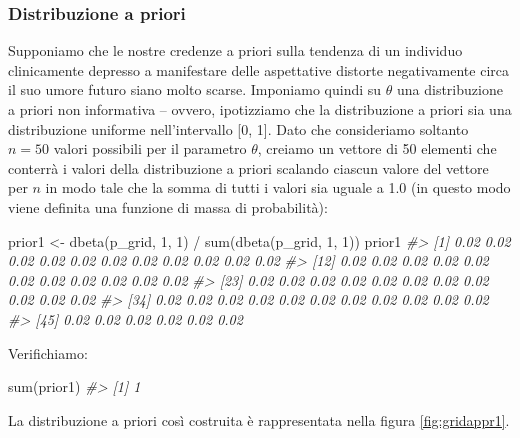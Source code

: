 \documentclass[
]{memoir}
\newenvironment{Shaded}{\begin{snugshade}}{\end{snugshade}}
\newcommand{\CommentTok}[1]{\textcolor[rgb]{0.56,0.35,0.01}{\textit{#1}}}
\newcommand{\DecValTok}[1]{\textcolor[rgb]{0.00,0.00,0.81}{#1}}
\newcommand{\FunctionTok}[1]{\textcolor[rgb]{0.00,0.00,0.00}{#1}}
\newcommand{\NormalTok}[1]{#1}
\newcommand{\OtherTok}[1]{\textcolor[rgb]{0.56,0.35,0.01}{#1}}
\newcommand{\SpecialCharTok}[1]{\textcolor[rgb]{0.00,0.00,0.00}{#1}}
\begin{document}
\hypertarget{distribuzione-a-priori}{%
\subsubsection{Distribuzione a priori}\label{distribuzione-a-priori}}

Supponiamo che le nostre credenze a priori sulla tendenza di un individuo clinicamente depresso a manifestare delle aspettative distorte negativamente circa il suo umore futuro siano molto scarse. Imponiamo quindi su \(\theta\) una distribuzione a priori non informativa -- ovvero, ipotizziamo che la distribuzione a priori sia una distribuzione uniforme nell'intervallo {[}0, 1{]}. Dato che consideriamo soltanto \(n = 50\) valori possibili per il parametro \(\theta\), creiamo un vettore di 50 elementi che conterrà i valori della distribuzione a priori scalando ciascun valore del vettore per \(n\) in modo tale che la somma di tutti i valori sia uguale a 1.0 (in questo modo viene definita una funzione di massa di probabilità):

\begin{Shaded}
\begin{Highlighting}[]
\NormalTok{prior1 }\OtherTok{\textless{}{-}} \FunctionTok{dbeta}\NormalTok{(p\_grid, }\DecValTok{1}\NormalTok{, }\DecValTok{1}\NormalTok{) }\SpecialCharTok{/} \FunctionTok{sum}\NormalTok{(}\FunctionTok{dbeta}\NormalTok{(p\_grid, }\DecValTok{1}\NormalTok{, }\DecValTok{1}\NormalTok{))}
\NormalTok{prior1}
\CommentTok{\#\textgreater{}  [1] 0.02 0.02 0.02 0.02 0.02 0.02 0.02 0.02 0.02 0.02 0.02}
\CommentTok{\#\textgreater{} [12] 0.02 0.02 0.02 0.02 0.02 0.02 0.02 0.02 0.02 0.02 0.02}
\CommentTok{\#\textgreater{} [23] 0.02 0.02 0.02 0.02 0.02 0.02 0.02 0.02 0.02 0.02 0.02}
\CommentTok{\#\textgreater{} [34] 0.02 0.02 0.02 0.02 0.02 0.02 0.02 0.02 0.02 0.02 0.02}
\CommentTok{\#\textgreater{} [45] 0.02 0.02 0.02 0.02 0.02 0.02}
\end{Highlighting}
\end{Shaded}

\noindent
Verifichiamo:

\begin{Shaded}
\begin{Highlighting}[]
\FunctionTok{sum}\NormalTok{(prior1)}
\CommentTok{\#\textgreater{} [1] 1}
\end{Highlighting}
\end{Shaded}

\noindent
La distribuzione a priori così costruita è rappresentata nella figura \ref{fig:gridappr1}.
\end{document}
